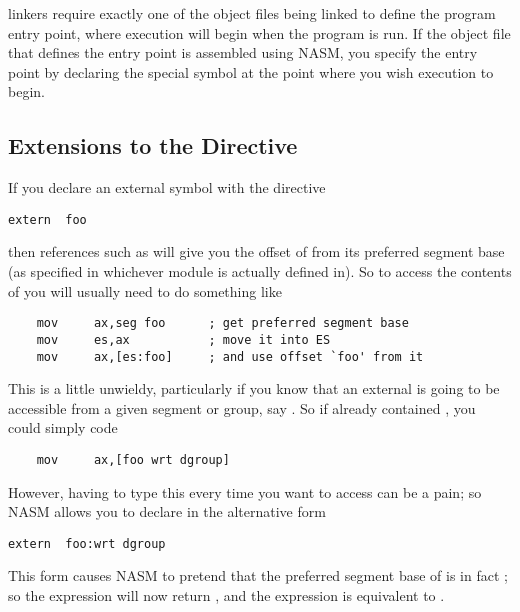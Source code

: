  linkers require exactly one of the object files being linked to
define the program entry point, where execution will begin when the
program is run. If the object file that defines the entry point is
assembled using NASM, you specify the entry point by declaring the
special symbol  at the point where you wish execution to
begin.

\subsection{ Extensions to the  Directive}
\label{subsec:objextern}

If you declare an external symbol with the directive

\begin{lstlisting}
extern  foo
\end{lstlisting}

then references such as  will give you the offset of
 from its preferred segment base (as specified in whichever
module  is actually defined in). So to access the contents of
 you will usually need to do something like

\begin{lstlisting}
    mov     ax,seg foo      ; get preferred segment base
    mov     es,ax           ; move it into ES
    mov     ax,[es:foo]     ; and use offset `foo' from it
\end{lstlisting}

This is a little unwieldy, particularly if you know that an external
is going to be accessible from a given segment or group, say
. So if  already contained ,
you could simply code

\begin{lstlisting}
    mov     ax,[foo wrt dgroup]
\end{lstlisting}

However, having to type this every time you want to access 
can be a pain; so NASM allows you to declare  in the
alternative form

\begin{lstlisting}
extern  foo:wrt dgroup
\end{lstlisting}

This form causes NASM to pretend that the preferred segment base of
 is in fact ; so the expression 
will now return , and the expression  is
equivalent to .

